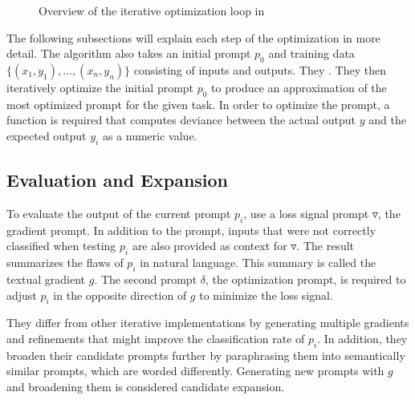 \begin{figure}
\centering

\caption{Overview of the iterative optimization loop in~\cite{pryzant2023AutomaticPrompt}}
\label{fig:gradient_descent}
\end{figure}

\begin{comment}
TODO: 
\begin{itemize}
    \item add legend
    \item symbolise core loop
\end{itemize}
\end{comment}

The following subsections will explain each step of the \ProTeGi optimization in more detail.
The \ProTeGi algorithm also takes an initial prompt $p_0$ and training data $\{(x_1, y_1), \dots, (x_n, y_n)\}$ consisting of inputs and outputs.
They .
They then iteratively optimize the initial prompt $p_0$ to produce an approximation of the most optimized prompt for the given task.
In order to optimize the prompt, a function is required that computes deviance between the actual output $y$ and the expected output $y_i$ as a numeric value.


\subsection{Evaluation and Expansion}
To evaluate the output of the current prompt $p_i$, \citeauthor{pryzant2023AutomaticPrompt} use a loss signal prompt $\triangledown$, the gradient prompt.
In addition to the prompt, inputs that were not correctly classified when testing $p_i$ are also provided as context for $\triangledown$.
The result summarizes the flaws of $p_i$ in natural language.
This summary is called the textual gradient $g$.
The second prompt $\delta$, the optimization prompt, is required to adjust $p_i$ in the opposite direction of $g$ to minimize the loss signal.

They differ from other iterative implementations by generating multiple gradients and refinements that might improve the classification rate of $p_i$.
In addition, they broaden their candidate prompts further by paraphrasing them into semantically similar prompts, which are worded differently.
Generating new prompts with $g$ and broadening them is considered candidate expansion.


